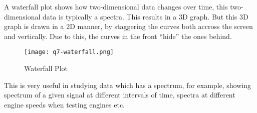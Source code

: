 \begin{tcolorbox}[breakable]
\begin{sol}
\begin{enumerate}
			      A waterfall plot shows how two-dimensional data
			      changes over time, this two-dimensional data is
			      typically a spectra. This results in a 3D graph.
			      But this 3D graph is drawn in a 2D manner, by
			      staggering the curves both accross the screen and
			      vertically. Due to this, the curves in the front
			      ``hide'' the ones behind.
			      \begin{figure}[H]
				      \centering
				      \texttt{[image: q7-waterfall.png]}
				      \caption{Waterfall Plot}
				      \label{fig:waterfall}
			      \end{figure}
			      This is very useful in
			      studying data which has a spectrum, for example,
			      showing spectrum of a given signal at different
			      intervals of time, spectra at different engine
			      speeds when testing engines etc.
		\end{enumerate}
	\end{sol}
\end{tcolorbox}
